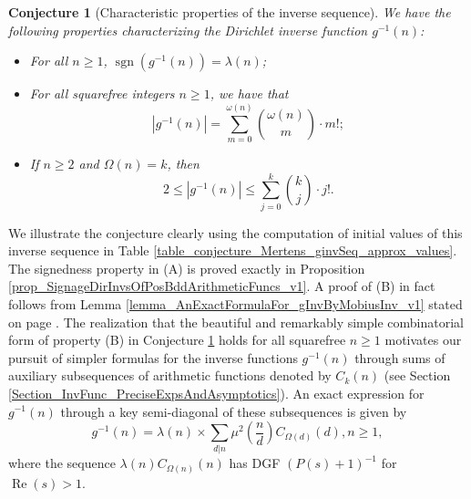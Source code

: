 \documentclass[11pt,reqno,a4letter]{article}
\numberwithin{figure}{section}
\numberwithin{table}{section}
\theoremstyle{plain}
\newtheorem{conjecture}[theorem]{Conjecture}
\numberwithin{theorem}{section}
\theoremstyle{definition}
\newcommand{\NBRef}[1]{}
\renewcommand{\Re}{\operatorname{Re}}
\begin{document}
\NBRef{A01-2020-04-26}
\begin{conjecture}[Characteristic properties of the inverse sequence] 
\label{lemma_gInv_MxExample} 
We have the following properties characterizing the 
Dirichlet inverse function $g^{-1}(n)$: 
\begin{itemize} 

\item[\textbf{(A)}] For all $n \geq 1$, $\operatorname{sgn}(g^{-1}(n)) = \lambda(n)$; 
\item[\textbf{(B)}] For all squarefree integers $n \geq 1$, we have that 
     \[
     |g^{-1}(n)| = \sum_{m=0}^{\omega(n)} \binom{\omega(n)}{m} \cdot m!; 
     \]
\item[\textbf{(C)}] If $n \geq 2$ and $\Omega(n) = k$, then 
     \[
     2 \leq |g^{-1}(n)| \leq \sum_{j=0}^{k} \binom{k}{j} \cdot j!. 
     \]
\end{itemize} 
\end{conjecture} 

We illustrate the conjecture clearly using the computation of initial values of 
this inverse sequence in 
Table \ref{table_conjecture_Mertens_ginvSeq_approx_values}. 
The signedness property in (A) is proved exactly in 
Proposition \ref{prop_SignageDirInvsOfPosBddArithmeticFuncs_v1}. 
A proof of (B) in fact follows from 
Lemma \ref{lemma_AnExactFormulaFor_gInvByMobiusInv_v1} 
stated on page \pageref{lemma_AnExactFormulaFor_gInvByMobiusInv_v1}. 
The realization that the beautiful and remarkably simple combinatorial form of property (B) 
in Conjecture \ref{lemma_gInv_MxExample} holds for all squarefree $n \geq 1$ 
motivates our pursuit of simpler formulas for the inverse functions $g^{-1}(n)$ 
through sums of auxiliary subsequences of arithmetic functions denoted by $C_k(n)$  
(see Section \ref{Section_InvFunc_PreciseExpsAndAsymptotics}). 
An exact expression for $g^{-1}(n)$ through a key semi-diagonal of these subsequences 
is given by 
\[
g^{-1}(n) = \lambda(n) \times \sum_{d|n} \mu^2\left(\frac{n}{d}\right) C_{\Omega(d)}(d), n \geq 1,  
\]
where the sequence $\lambda(n) C_{\Omega(n)}(n)$ has DGF $(P(s)+1)^{-1}$ for $\Re(s) > 1$. 
\end{document}

